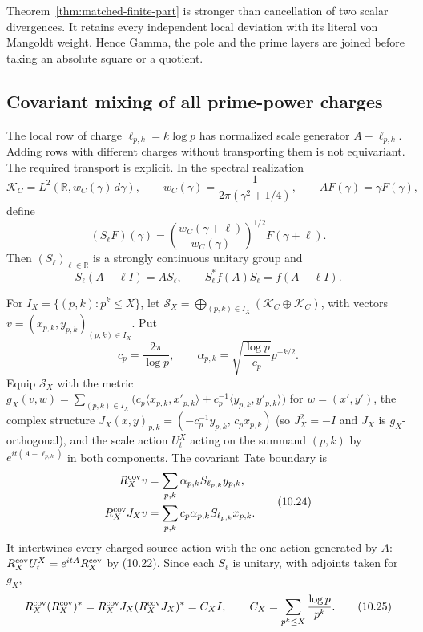 \documentclass[11pt]{amsart}
\theoremstyle{definition}
\theoremstyle{remark}
\newcommand{\dd}{\,d}
\begin{document}
Theorem~\ref{thm:matched-finite-part} is stronger than cancellation of
two scalar divergences.  It retains every independent local deviation with
its literal von Mangoldt weight.  Hence Gamma, the pole and the prime
layers are joined before taking an absolute square or a quotient.

\subsection{Covariant mixing of all prime-power charges}

The local row of charge \(\ell_{p,k}=k\log p\) has normalized scale
generator \(A-\ell_{p,k}\).  Adding rows with different charges without
transporting them is not equivariant.  The required transport is explicit.
In the spectral realization
\[
 \mathscr K_C=L^2(\mathbb R,w_C(\gamma)\dd\gamma),
 \qquad
 w_C(\gamma)=\frac1{2\pi(\gamma^2+1/4)},
 \qquad AF(\gamma)=\gamma F(\gamma),
 \tag{10.20}
\]
define
\[
 (S_\ell F)(\gamma)
 =\left(\frac{w_C(\gamma+\ell)}{w_C(\gamma)}\right)^{1/2}
  F(\gamma+\ell).
 \tag{10.21}
\]
Then \((S_\ell)_{\ell\in\mathbb R}\) is a strongly continuous unitary
group and
\[
 S_\ell(A-\ell I)=AS_\ell,
 \qquad
 S_\ell^*f(A)S_\ell=f(A-\ell I).
 \tag{10.22}
\]

For \(I_X=\{(p,k):p^k\le X\}\), let
\(\mathscr S_X=\bigoplus_{(p,k)\in I_X}(\mathscr K_C\oplus\mathscr K_C)\),
with vectors \(v=(x_{p,k},y_{p,k})_{(p,k)\in I_X}\).  Put
\[
 c_p=\frac{2\pi}{\log p},
 \qquad
 \alpha_{p,k}=\sqrt{\frac{\log p}{c_p}}p^{-k/2}.
 \tag{10.23}
\]
Equip \(\mathscr S_X\) with the metric
\(g_X(v,w)=\sum_{(p,k)\in I_X}\bigl(c_p\langle x_{p,k},x'_{p,k}\rangle
+c_p^{-1}\langle y_{p,k},y'_{p,k}\rangle\bigr)\) for \(w=(x',y')\), the
complex structure \(J_X(x,y)_{p,k}=(-c_p^{-1}y_{p,k},\,c_px_{p,k})\) (so
\(J_X^2=-I\) and \(J_X\) is \(g_X\)-orthogonal), and the scale action
\(U^X_t\) acting on the summand \((p,k)\) by
\(e^{it(A-\ell_{p,k})}\) in both components.
The covariant Tate boundary is
\[
 \begin{aligned}
 R_X^{\rm cov}v
 &=\sum_{p,k}\alpha_{p,k}S_{\ell_{p,k}}y_{p,k},\\
 R_X^{\rm cov}J_Xv
 &=\sum_{p,k}c_p\alpha_{p,k}S_{\ell_{p,k}}x_{p,k}.
 \end{aligned}
 \tag{10.24}
\]
It intertwines every charged source action with the one action generated
by \(A\): \(R_X^{\rm cov}U^X_t=e^{itA}R_X^{\rm cov}\) by (10.22).  Since
each \(S_\ell\) is unitary, with adjoints taken for \(g_X\),
\[
 R_X^{\rm cov}(R_X^{\rm cov})^*
 =R_X^{\rm cov}J_X(R_X^{\rm cov}J_X)^*
 =C_XI,
 \qquad
 C_X=\sum_{p^k\le X}\frac{\log p}{p^k}.
 \tag{10.25}
\]
\end{document}

